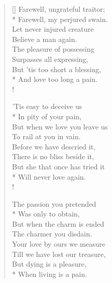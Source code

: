 \documentclass[MAIN]{subfiles}
\begin{document}
\settowidth{\versewidth}{\vin Farewell, my perjured swain.}
\begin{verse}[\versewidth]
Farewell, ungrateful traitor;\\*
\vin Farewell, my perjured swain.\\
Let never injured creature\\
\vin Believe a man again.\\
The pleasure of possessing\\
Surpasses all expressing,\\
But 'tis too short a blessing,\\*
\vin And love too long a pain.\\!

'Tis easy to deceive us\\*
\vin In pity of your pain,\\
But when we love you leave us\\
\vin To rail at you in vain.\\
Before we have descried it,\\
There is no bliss beside it,\\
But she that once has tried it\\*
\vin Will never love again.\\!

The passion you pretended\\*
\vin Was only to obtain,\\
But when the charm is ended\\
\vin The charmer you disdain.\\
Your love by ours we measure\\
Till we have lost our treasure,\\
But dying is a pleasure,\\*
\vin When living is a pain.
\end{verse}
\end{document}
